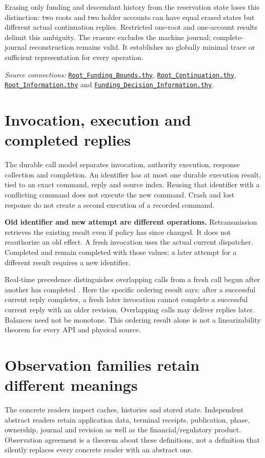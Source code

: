 \documentclass[10pt,a4paper]{article}
\newcommand{\code}[1]{\texttt{\detokenize{#1}}}
\newcommand{\source}[1]{\href{../#1}{\nolinkurl{#1}}}
\begin{document}
Erasing only funding and descendant history from the reservation state loses
this distinction: two roots and two holder accounts can have equal erased
states but different actual continuation replies. Restricted one-root and
one-account results delimit this ambiguity. The erasure excludes the machine
journal; complete-journal reconstruction remains valid. It establishes no
globally minimal trace or sufficient representation for every operation.

\textit{Source connections:} \source{Root_Funding_Bounds.thy},
\source{Root_Continuation.thy}, \source{Root_Information.thy} and
\source{Funding_Decision_Information.thy}.

\clearpage
\section*{Invocation, execution and completed replies}
The durable call model separates invocation, authority execution, response
collection and completion. An identifier has at most one durable execution
result, tied to an exact command, reply and source index. Reusing that identifier
with a conflicting command does not execute the new command. Crash and lost
response do not create a second execution of a recorded command.

\textbf{Old identifier and new attempt are different operations.}
Retransmission retrieves the existing result even if policy has since changed.
It does not reauthorize an old effect. A fresh invocation uses the actual current
dispatcher. Completed \code{Busy} and \code{Unavailable} remain completed with
those values; a later attempt for a different result requires a new identifier.

Real-time precedence distinguishes overlapping calls from a fresh call begun
after another has completed \cite{herlihyWing1990}. Here the specific ordering
result says: after a successful current reply completes, a fresh later invocation
cannot complete a successful current reply with an older revision. Overlapping
calls may deliver replies later. Balances need not be monotone. This ordering
result alone is not a linearizability theorem for every API and physical source.

\section*{Observation families retain different meanings}
The concrete readers inspect caches, histories and stored state. Independent
abstract readers retain application data, terminal receipts, publication,
phase, ownership, journal and revision as well as the financial/regulatory
product. Observation agreement is a theorem about these definitions, not a
definition that silently replaces every concrete reader with an abstract one.
\end{document}
